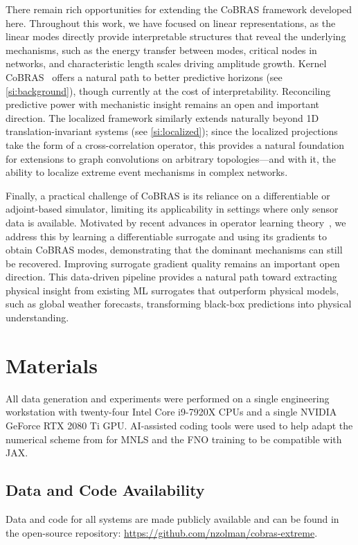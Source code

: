 \documentclass[twocolumn,10pt]{article}
\begin{document}
There remain rich opportunities for extending the CoBRAS framework developed here. Throughout this work, we have focused on linear representations, as the linear modes directly provide interpretable structures that reveal the underlying mechanisms, such as the energy transfer between modes, critical nodes in networks, and characteristic length scales driving amplitude growth. Kernel CoBRAS~\cite{otto2023model} offers a natural path to better predictive horizons (see \ref{si:background}), though currently at the cost of interpretability. Reconciling predictive power with mechanistic insight remains an open and important direction. The localized framework similarly extends naturally beyond 1D translation-invariant systems (see \ref{si:localized}); since the localized projections take the form of a cross-correlation operator, this provides a natural foundation for extensions to graph convolutions on arbitrary topologies---and with it, the ability to localize extreme event mechanisms in complex networks.

Finally, a practical challenge of CoBRAS is its reliance on a differentiable or adjoint-based simulator, limiting its applicability in settings where only sensor data is available. Motivated by recent advances in operator learning theory~\cite{boulle2024mathematical, boulle2024operator}, we address this by learning a differentiable surrogate and using its gradients to obtain CoBRAS modes, demonstrating that the dominant mechanisms can still be recovered. Improving surrogate gradient quality remains an important open direction. This data-driven pipeline provides a natural path toward extracting physical insight from existing ML surrogates that outperform physical models, such as global weather forecasts, transforming black-box predictions into physical understanding.

\section*{Materials}
All data generation and experiments were performed on a single engineering workstation with twenty-four Intel Core i9-7920X CPUs and a single NVIDIA GeForce RTX 2080 Ti GPU. AI-assisted coding tools were used to help adapt the numerical scheme from \cite{kassam2005fourth} for MNLS and the FNO training to be compatible with JAX. 

\subsection*{Data and Code Availability}
Data and code for all systems are made publicly available and can be found in the open-source repository: \url{https://github.com/nzolman/cobras-extreme}.
\end{document}
